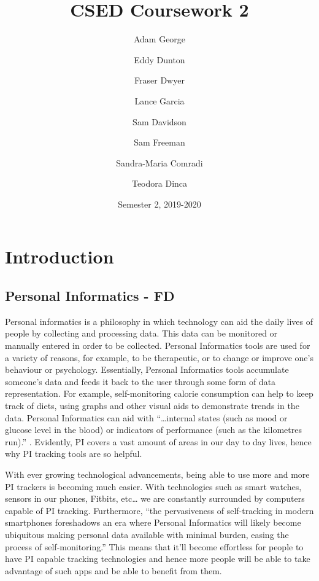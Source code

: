 \documentclass[10pt]{report}
\title{CSED Coursework 2}
\author{
	Adam George
	\and
	Eddy Dunton
	\and
	Fraser Dwyer
	\and	
	Lance Garcia
	\and
	Sam Davidson
	\and
	Sam Freeman
	\and
	Sandra-Maria Comradi
	\and
	Teodora Dinca
}
\date{Semester 2,  2019-2020}
\begin{document}
\begin{titlepage}
\maketitle
\end{titlepage}

\tableofcontents



\chapter{Introduction}


\section{Personal Informatics - FD}

Personal informatics is a philosophy in which technology can aid the daily lives of people by collecting and processing data. This data can be monitored or manually entered in order to be collected. Personal Informatics tools are used for a variety of reasons, for example, to be therapeutic, or to change or improve one’s behaviour or psychology. Essentially, Personal Informatics tools accumulate someone’s data and feeds it back to the user through some form of data representation. For example, self-monitoring calorie consumption can help to keep track of diets, using graphs and other visual aids to demonstrate trends in the data. Personal Informatics can aid with “…internal states (such as mood or glucose level in the blood) or indicators of performance (such as the kilometres run).”  \cite{Rapp2014a} . Evidently, PI covers a vast amount of areas in our day to day lives, hence why PI tracking tools are so helpful.

With ever growing technological advancements, being able to use more and more PI trackers is becoming much easier. With technologies such as smart watches, sensors in our phones, Fitbits, etc… we are constantly surrounded by computers capable of PI tracking. Furthermore, “the pervasiveness of self-tracking in modern smartphones foreshadows an era where Personal Informatics will likely become ubiquitous making personal data available with minimal burden, easing the process of self-monitoring.” This means that it’ll become effortless for people to have PI capable tracking technologies and hence more people will be able to take advantage of such apps and be able to benefit from them.\cite{Rapp2016}
\end{document}
